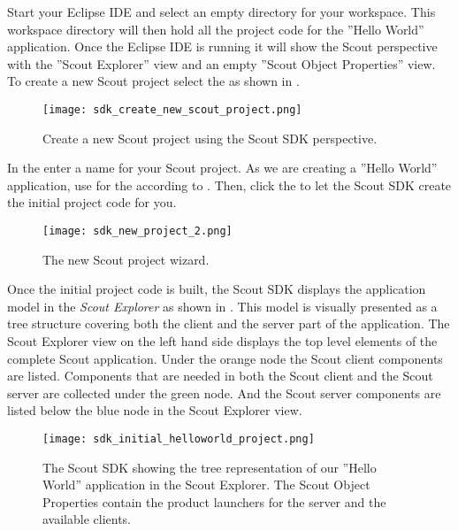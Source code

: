 %

Start your Eclipse IDE and select an empty directory for your workspace. 
This workspace directory will then hold all the project code for the ''Hello World'' application. 
Once the Eclipse IDE is running it will show the Scout perspective with the ''Scout Explorer'' view and an empty ''Scout Object Properties'' view.
To create a new Scout project select the  as shown in .

\begin{figure}
\texttt{[image: sdk\_create\_new\_scout\_project.png]}
\caption{Create a new Scout project using the Scout SDK perspective.}
\end{figure}

In the  enter a name for your Scout project. 
As we are creating a ''Hello World'' application, use  for the  according to .
Then, click the  to let the Scout SDK create the initial project code for you.

\begin{figure}
\texttt{[image: sdk\_new\_project\_2.png]}
\caption{The new Scout project wizard.}
\end{figure}

Once the initial project code is built, the Scout SDK displays the application model in the \textit{Scout Explorer} as shown in .
This model is visually presented as a tree structure covering both the client and the server part of the application.
The Scout Explorer view on the left hand side displays the top level elements of the complete Scout application.
Under the orange node the Scout client components are listed. 
Components that are needed in both the Scout client and the Scout server are collected under the green node.
And the Scout server components are listed below the blue node in the Scout Explorer view.

\begin{figure}
\texttt{[image: sdk\_initial\_helloworld\_project.png]}
\caption{The Scout SDK showing the tree representation of our ''Hello World'' application in the Scout Explorer.
The Scout Object Properties contain the product launchers for the server and the available clients.}
\end{figure}

